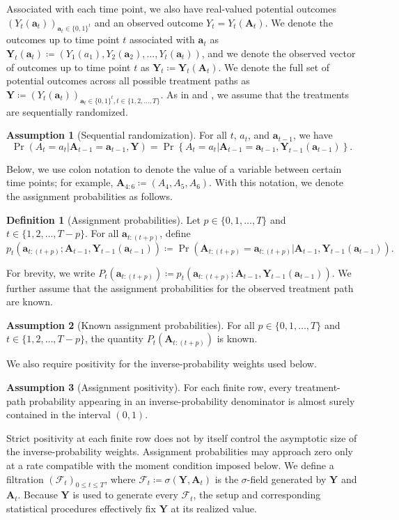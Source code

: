 \documentclass[11pt]{article}
\renewcommand\vec[1]{\boldsymbol{#1}}
\newcommand\mat[1]{\mathbf{#1}}
\newcommand{\F}{\mathcal{F}}
\theoremstyle{definition}
\newtheorem{assumption}{Assumption}
\newtheorem{definition}{Definition}
\begin{document}
Associated with each time point, we also have real-valued potential outcomes $(Y_t(\vec{a}_{t}))_{\vec{a}_{t} \in \{0, 1\}^{t}}$ and an observed outcome $Y_t = Y_t(\vec{A}_t)$.
We denote the outcomes up to time point $t$ associated with $\vec{a}_t$ as $\vec{Y}_t(\vec{a}_t) \coloneqq (Y_1(a_1), Y_2(\vec{a}_2), \ldots, Y_t(\vec{a}_t))$, and we denote the observed vector of outcomes up to time point $t$ as $\vec{Y}_t \coloneqq \vec{Y}_t(\vec{A}_t)$.
We denote the full set of potential outcomes across all possible treatment paths as $\mat{Y} \coloneqq (Y_t(\vec{a}_{t}))_{\vec{a}_{t} \in \{0, 1\}^{t}, t \in \{1, 2, \ldots, T\}}$.
As in \citet{bojinov_panel_2021} and \citet{bojinov_time_2019}, we assume that the treatments are sequentially randomized.
\begin{assumption}[Sequential randomization]\label{assumption:sequential-randomization}
For all $t$, $a_t$, and $\vec{a}_{t-1}$, we have
\[
\Pr(A_t = a_t | \vec{A}_{t-1} = \vec{a}_{t-1}, \mat{Y})
= \Pr\left\{A_t = a_t | \vec{A}_{t-1} = \vec{a}_{t-1}, \vec{Y}_{t-1}(\vec{a}_{t-1})\right\}.
\]
\end{assumption}
Below, we use colon notation to denote the value of a variable between certain time points; for example, $\vec{A}_{4:6} \coloneqq (A_4, A_5, A_6)$.
With this notation, we denote the assignment probabilities as follows.
\begin{definition}[Assignment probabilities]\label{def:assignment-probs}
Let $p \in \{0, 1, \ldots, T\}$ and $t \in \{1, 2, \ldots, T-p\}$.
For all $\vec{a}_{t:(t+p)}$, define
\[
p_t\left(\vec{a}_{t:(t+p)} ; \vec{A}_{t-1}, \vec{Y}_{t-1}(\vec{a}_{t-1}) \right) \coloneqq \Pr\left(\vec{A}_{t:(t+p)} = \vec{a}_{t:(t+p)} | \vec{A}_{t-1}, \vec{Y}_{t-1}(\vec{a}_{t-1})\right).
\]
\end{definition}
For brevity, we write $P_t\left(\vec{a}_{t:(t+p)}\right) \coloneqq p_t\left(\vec{a}_{t:(t+p)} ; \vec{A}_{t-1}, \vec{Y}_{t-1}(\vec{a}_{t-1}) \right)$.
We further assume that the assignment probabilities for the observed treatment path are known.
\begin{assumption}[Known assignment probabilities]\label{assumption:known-assignment}
For all $p \in \{0, 1, \ldots, T\}$ and $t \in \{1, 2, \ldots, T-p\}$, the quantity $P_t(\vec{A}_{t:(t+p)})$ is known.
\end{assumption}
We also require positivity for the inverse-probability weights used below.
\begin{assumption}[Assignment positivity]\label{assumption:assignment-positivity}
For each finite row, every treatment-path probability appearing in an inverse-probability denominator is almost surely contained in the interval $(0, 1)$.
\end{assumption}
Strict positivity at each finite row does not by itself control the asymptotic size of the inverse-probability weights.
Assignment probabilities may approach zero only at a rate compatible with the moment condition imposed below.
We define a filtration $(\F_t)_{0 \leq t \leq T}$, where $\F_t \coloneqq \sigma(\mat{Y}, \vec{A}_t)$ is the $\sigma$-field generated by $\mat{Y}$ and $\vec{A}_t$.
Because $\mat{Y}$ is used to generate every $\F_t$, the setup and corresponding statistical procedures effectively fix $\mat{Y}$ at its realized value.
\end{document}
